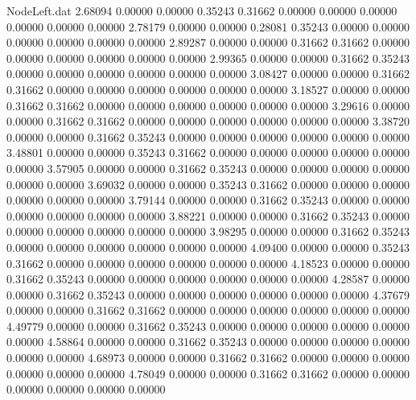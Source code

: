 \begin{filecontents}{NodeLeft.dat}
   2.68094    0.00000    0.00000     0.35243    0.31662    0.00000    0.00000    0.00000    0.00000    0.00000    0.00000
   2.78179    0.00000    0.00000     0.28081    0.35243    0.00000    0.00000    0.00000    0.00000    0.00000    0.00000
   2.89287    0.00000    0.00000     0.31662    0.31662    0.00000    0.00000    0.00000    0.00000    0.00000    0.00000
   2.99365    0.00000    0.00000     0.31662    0.35243    0.00000    0.00000    0.00000    0.00000    0.00000    0.00000
   3.08427    0.00000    0.00000     0.31662    0.31662    0.00000    0.00000    0.00000    0.00000    0.00000    0.00000
   3.18527    0.00000    0.00000     0.31662    0.31662    0.00000    0.00000    0.00000    0.00000    0.00000    0.00000
   3.29616    0.00000    0.00000     0.31662    0.31662    0.00000    0.00000    0.00000    0.00000    0.00000    0.00000
   3.38720    0.00000    0.00000     0.31662    0.35243    0.00000    0.00000    0.00000    0.00000    0.00000    0.00000
   3.48801    0.00000    0.00000     0.35243    0.31662    0.00000    0.00000    0.00000    0.00000    0.00000    0.00000
   3.57905    0.00000    0.00000     0.31662    0.35243    0.00000    0.00000    0.00000    0.00000    0.00000    0.00000
   3.69032    0.00000    0.00000     0.35243    0.31662    0.00000    0.00000    0.00000    0.00000    0.00000    0.00000
   3.79144    0.00000    0.00000     0.31662    0.35243    0.00000    0.00000    0.00000    0.00000    0.00000    0.00000
   3.88221    0.00000    0.00000     0.31662    0.35243    0.00000    0.00000    0.00000    0.00000    0.00000    0.00000
   3.98295    0.00000    0.00000     0.31662    0.35243    0.00000    0.00000    0.00000    0.00000    0.00000    0.00000
   4.09400    0.00000    0.00000     0.35243    0.31662    0.00000    0.00000    0.00000    0.00000    0.00000    0.00000
   4.18523    0.00000    0.00000     0.31662    0.35243    0.00000    0.00000    0.00000    0.00000    0.00000    0.00000
   4.28587    0.00000    0.00000     0.31662    0.35243    0.00000    0.00000    0.00000    0.00000    0.00000    0.00000
   4.37679    0.00000    0.00000     0.31662    0.31662    0.00000    0.00000    0.00000    0.00000    0.00000    0.00000
   4.49779    0.00000    0.00000     0.31662    0.35243    0.00000    0.00000    0.00000    0.00000    0.00000    0.00000
   4.58864    0.00000    0.00000     0.31662    0.35243    0.00000    0.00000    0.00000    0.00000    0.00000    0.00000
   4.68973    0.00000    0.00000     0.31662    0.31662    0.00000    0.00000    0.00000    0.00000    0.00000    0.00000
   4.78049    0.00000    0.00000     0.31662    0.31662    0.00000    0.00000    0.00000    0.00000    0.00000    0.00000

\end{filecontents}
